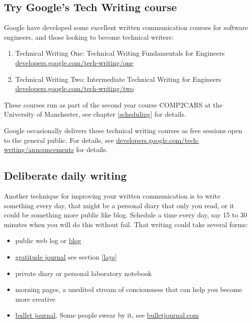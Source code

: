 \documentclass[
]{book}
\providecommand{\tightlist}{%
  \setlength{\itemsep}{0pt}\setlength{\parskip}{0pt}}
\begin{document}
\hypertarget{techwriting}{%
\subsection{Try Google's Tech Writing course}\label{techwriting}}

Google have developed some excellent written communication courses for software engineers, and those looking to become technical writers:

\begin{enumerate}
\def\labelenumi{\arabic{enumi}.}
\tightlist
\item
  Technical Writing One: Technical Writing Fundamentals for Engineers \href{https://developers.google.com/tech-writing/one}{developers.google.com/tech-writing/one}
\item
  Technical Writing Two: Intermediate Technical Writing for Engineers \href{https://developers.google.com/tech-writing/two}{developers.google.com/tech-writing/two}
\end{enumerate}

These courses run as part of the second year course COMP2CARS at the University of Manchester, see chapter \ref{scheduling} for details.

Google occasionally delivers these technical writing courses as free sessions open to the general public. For details, see \href{https://developers.google.com/tech-writing/announcements}{developers.google.com/tech-writing/announcements} for details.

\hypertarget{dailywrite}{%
\subsection{Deliberate daily writing}\label{dailywrite}}

Another technique for improving your written communication is to write something every day, that might be a personal diary that only you read, or it could be something more public like blog. Schedule a time every day, say 15 to 30 minutes when you will do this without fail. That writing could take several forms:

\begin{itemize}
\tightlist
\item
  public web log or \href{https://en.wikipedia.org/wiki/Blog}{blog}
\item
  \href{https://en.wikipedia.org/wiki/Gratitude_journal}{gratitude journal} see section \ref{lays}
\item
  private diary or personal laboratory notebook
\item
  morning pages, a unedited stream of conciousness that can help you become more creative \citep{cameron, burkeman}
\item
  \href{https://en.wikipedia.org/wiki/Bullet_journal}{bullet journal}. Some people swear by it, see \href{https://bulletjournal.com/}{bulletjournal.com}
\end{itemize}
\end{document}
